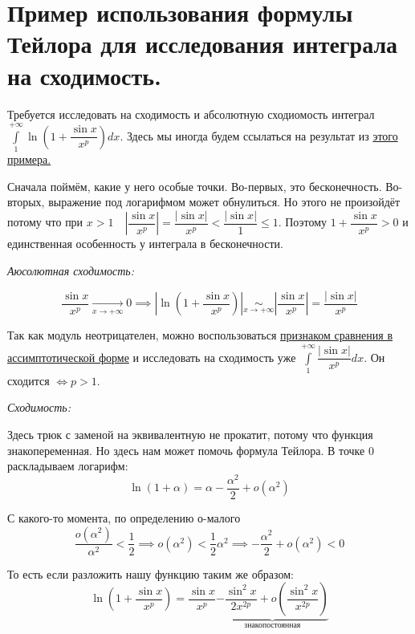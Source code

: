 \documentclass[../main.tex]{subfiles}
\begin{document}
\newpage
\section{Пример использования формулы Тейлора для исследования интеграла на сходимость.}

Требуется исследовать на сходимость и абсолютную сходиомость интеграл \( \displaystyle\int\limits_{ 1}^{ + \infty } \ln \left( 1+ \dfrac{ \sin x}{ x^p} \right)dx\). Здесь мы иногда будем ссылаться на результат из \hyperlink{ex:converge_sin}{этого примера.}

Сначала поймём, какие у него особые точки. Во-первых, это бесконечность. Во-вторых, выражение под логарифмом может обнулиться. Но этого не произойдёт потому что при \( x > 1\quad \left| \dfrac{ \sin x}{ x^p} \right|= \dfrac{ \left|\sin x\right|}{ x^p } < \dfrac{ \left|\sin x\right|}{ 1} \leq 1  \). Поэтому \( 1+ \dfrac{ \sin x}{ x^p} >0\) и единственная особенность у интеграла в бесконечности. 

\emph{Аюсолютная сходимость:}

\[ \dfrac{ \sin x}{ x^p} \underset{x \rightarrow + \infty }{\longrightarrow} 0 \implies \left| \ln \left( 1+ \dfrac{ \sin x}{ x^p} \right)\right|\underset{x \rightarrow + \infty }{\sim} \left| \dfrac{ \sin x}{ x^p} \right|= \dfrac{ \left|\sin x\right|}{ x^p} \]

Так как модуль неотрицателен, можно воспользоваться \hyperlink{thm:converge_sim}{признаком сравнения в ассимптотической форме} и исследовать на сходимость уже \( \displaystyle\int\limits_{ 1}^{ + \infty} \dfrac{ \left|\sin x\right|}{ x^p}dx \). Он сходится \( \Longleftrightarrow p>1\).

\emph{Сходимость:}

Здесь трюк с заменой на эквивалентную не прокатит, потому что функция знакопеременная. Но здесь нам может помочь формула Тейлора. В точке \( 0\) раскладываем логарифм:
\[ \ln \left( 1+ \alpha \right)= \alpha - \dfrac{ \alpha^2}{ 2} +o\left( \alpha^2 \right) \]

С какого-то момента, по определению о-малого 
\[ \dfrac{ o\left(\alpha^2\right)}{ \alpha ^2} < \dfrac{ 1}{ 2} \implies o\left( \alpha ^2\right) < \dfrac{ 1}{ 2} \alpha ^2 \implies - \dfrac{ \alpha^2}{ 2} +o\left(\alpha^2\right) <0\]

То есть если разложить нашу функцию таким же образом:
\[ \ln \left( 1+ \dfrac{ \sin x}{ x^p} \right)=\dfrac{ \sin x}{ x^p} \underbrace{- \dfrac{ \sin^2 x}{ 2x^{2p}} + o\left( \dfrac{ \sin^2 x}{ x^{2p}}\right)}_{\text{знакопостоянная}}\]
\end{document}
